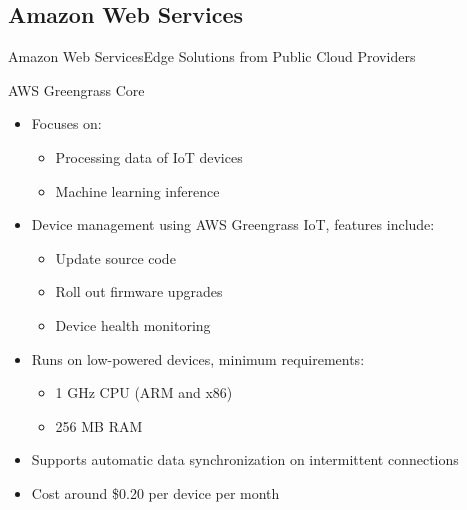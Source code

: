 \documentclass[10pt,xcolor={dvipsnames},notes]{beamer}
\renewcommand{\logofile}{example-grid-100x100pt}
\renewcommand{\logoscale}{0.0}
\begin{document}
\subsection{Amazon Web Services}
\renewcommand{\logofile}{img/aws}
\renewcommand{\logoscale}{0.7}
\begin{frame}{Amazon Web Services}{Edge Solutions from Public Cloud Providers}
\begin{block}{AWS Greengrass Core}
  \begin{itemize}
    \item Focuses on:
    \begin{itemize}
        \item Processing data of IoT devices
        \item Machine learning inference
    \end{itemize}
    \item Device management using AWS Greengrass IoT, features include:
    \begin{itemize}
        \item Update source code
        \item Roll out firmware upgrades
        \item Device health monitoring
    \end{itemize}
    \item Runs on low-powered devices, minimum requirements:
    \begin{itemize}
        \item 1 GHz CPU (ARM and x86)
        \item 256 MB RAM
    \end{itemize}
    \item Supports automatic data synchronization on intermittent connections
    \item Cost around \$0.20 per device per month
  \end{itemize}
  
\end{block}
\end{frame}

\end{document}
